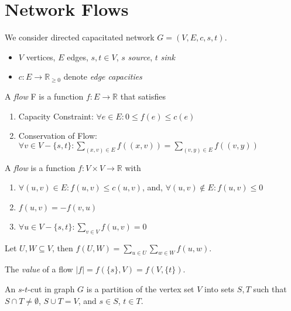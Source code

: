 \section{Network Flows}

We consider directed capacitated network $G = (V, E, c, s, t)$.
\begin{itemize}
\item $V$ vertices, $E$ edges, $s,t \in V$, $s$ \emph{source}, $t$ \emph{sink}
\item $c: E \rightarrow \mathbb{R}_{\ge 0}$ denote \emph{edge capacities}
\end{itemize}

\begin{mydefinition}
A \emph{flow} F is a function $f: E \rightarrow \mathbb{R}$ that satisfies
\begin{enumerate}
\item Capacity Constraint: $\forall e \in E: 0 \le f(e) \le c(e)$ 
\item Conservation of Flow: $\forall v \in V - \{s,t\}: \sum_{(x,v) \in E} f((x,v)) = \sum_{(v,y) \in E} f((v,y))$
\end{enumerate}

\end{mydefinition}

\begin{mydefinition}
A \emph{flow} is a function $f: V \times V \rightarrow \mathbb{R}$ with
\begin{enumerate}
\item $\forall (u,v) \in E: f(u,v) \le c(u,v)$, and, $\forall (u,v) \notin E: f(u,v) \le 0$
\item $f(u, v) = - f(v,u)$
\item $\forall u \in V - \{s,t\}: \sum_{v \in V} f(u,v) = 0$
\end{enumerate}
\end{mydefinition}

\begin{mydefinition}
Let $U, W \subseteq V$, then $f(U,W) = \sum_{u \in U} \sum_{w \in W} f(u,w)$.
\end{mydefinition}

\begin{mydefinition}
The \emph{value} of a flow $|f| = f(\{s\}, V) = f(V, \{t\})$.
\end{mydefinition}

\begin{mydefinition}
An $s$-$t$-cut in graph $G$ is a partition of the vertex set $V$ into sets $S, T$ such that $S \cap T \neq \emptyset$, $S \cup T = V$, and $s \in S$, $t \in T$.
\end{mydefinition}

